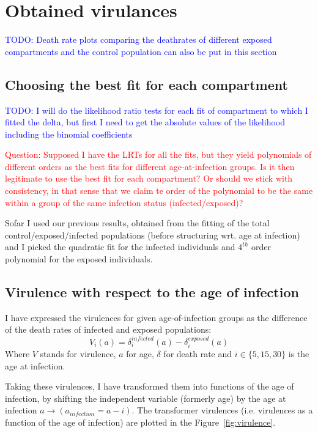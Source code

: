 \documentclass[10pt]{article}         %
\begin{document}
\clearpage
\section{Obtained virulances}

\textcolor{blue}{TODO: Death rate plots comparing the deathrates of different exposed compartments and the control population can also be put in this section}
\subsection{Choosing the best fit for each compartment}

\textcolor{blue}{TODO: I will do the likelihood ratio tests for each fit of compartment to which I fitted the delta, but first I need to get the absolute values of the likelihood including the binomial coefficients}


\textcolor{red}{Question: Supposed I have the LRTs for all the fits, but they yield polynomials of different orders as the best fits for different age-at-infection groups. Is it then legitimate to use the best fit for each compartment? Or should we stick with consistency, in that sense that we claim te order of the polynomial to be the same within a group of the same infection status (infected/exposed)?}

Sofar I used our previous results, obtained from the fitting of the total control/exposed/infected populations (before structuring wrt. age at infection) and I picked the quadratic fit for the infected individuals and $4^{th}$ order polynomial for the exposed individuals.


\subsection{Virulence with respect to the age of infection}

I have expressed the virulences for given age-of-infection groups as the difference of the death rates of infected and exposed populations:
\begin{equation}
V_{i}(a) = \delta_{i}^{infected}(a) - \delta_{i}^{exposed}(a)
\label{eq:virulence}
\end{equation}
Where $V$ stands for virulence, $a$ for age, $\delta$ for death rate and $i\in \{5,15,30\}$ is the age at infection.\newline

Taking these virulences, I have transformed them into functions of the age of infection, by shifting the independent variable (formerly age) by the age at infection $a \rightarrow (a_{infection} = a - i)$. The transformer virulences (i.e. virulences as a function of the age of infection) are plotted in the Figure~\ref{fig:virulence}.
\end{document}
